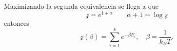 Maximizando la segunda equivalencia se llega a que
	$$ \mathcal{z} = e^{1 + \alpha} \qquad \alpha + 1 = \log{\mathcal{z}} $$
entonces 
	$$ \boxed{ \mathcal{z} (\beta) = \sum _{i=1} ^k e^{-\beta E_i}, \quad \beta = \frac{1}{k_B T}. } $$








































